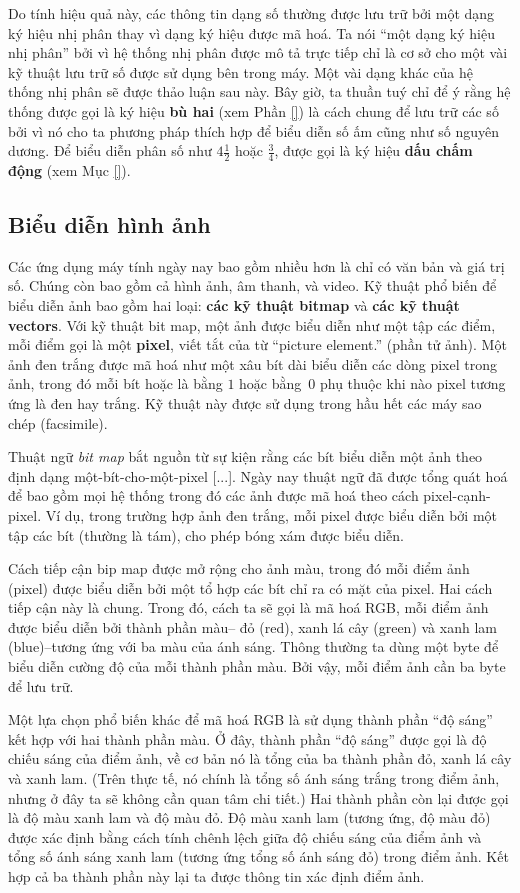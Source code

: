 Do tính hiệu quả này, các thông tin dạng số thường được lưu trữ bởi một dạng ký hiệu nhị
phân thay vì dạng ký hiệu được mã hoá. Ta nói ``một dạng ký hiệu nhị phân'' bởi vì hệ
thống nhị phân được mô tả trực tiếp chỉ là cơ sở cho một vài kỹ thuật lưu trữ số được sử
dụng bên trong máy. Một vài dạng khác của hệ thống nhị phân sẽ được thảo luận sau này. Bây
giờ, ta thuần tuý chỉ để ý rằng hệ thống được gọi là ký hiệu \textbf{bù hai} (xem Phần
\ref{}) là cách chung để lưu trữ các số bởi vì nó cho ta phương pháp thích hợp để biểu
diễn số ấm cũng như số nguyên dương. Để biểu diễn phân số như $4\frac{1}{2}$ hoặc
$\frac{3}{4}$, được gọi là ký hiệu \textbf{dấu chấm động} (xem Mục \ref{}).

\subsection*{Biểu diễn hình ảnh}

Các ứng dụng máy tính ngày nay bao gồm nhiều hơn là chỉ có văn bản và giá trị số. Chúng
còn bao gồm cả hình ảnh, âm thanh, và video. Kỹ thuật phổ biến để biểu diễn ảnh bao gồm
hai loại: \textbf{các kỹ thuật bitmap} và \textbf{các kỹ thuật vectors}. Với kỹ thuật bit
map, một ảnh được biểu diễn như một tập các điểm, mỗi điểm gọi là một \textbf{pixel}, viết
tắt của từ ``picture element.'' (phần tử ảnh). Một ảnh đen trắng được mã hoá như một xâu
bít dài biểu diễn các dòng pixel trong ảnh, trong đó mỗi bít hoặc là bằng $1$ hoặc
bằng~$0$ phụ thuộc khi nào pixel tương ứng là đen hay trắng. Kỹ thuật này được sử dụng
trong hầu hết các máy sao chép (facsimile).

Thuật ngữ \textit{bit map} bắt nguồn từ sự kiện rằng các bít biểu diễn một ảnh theo định
dạng một-bít-cho-một-pixel [...]. Ngày nay thuật ngữ đã được tổng quát hoá để bao gồm mọi
hệ thống trong đó các ảnh được mã hoá theo cách pixel-cạnh-pixel. Ví dụ, trong trường hợp
ảnh đen trắng, mỗi pixel được biểu diễn bởi một tập các bít (thường là tám), cho phép bóng
xám được biểu diễn.

Cách tiếp cận bip map được mở rộng cho ảnh màu, trong đó mỗi điểm ảnh (pixel) được biểu
diễn bởi một tổ hợp các bít chỉ ra có mặt của pixel. Hai cách tiếp cận này là chung. Trong
đó, cách ta sẽ gọi là mã hoá RGB, mỗi điểm ảnh được biểu diễn bởi thành phần màu-- đỏ
(red), xanh lá cây (green) và xanh lam (blue)--tương ứng với ba màu của ánh sáng. Thông
thường ta dùng một byte để biểu diễn cường độ của mỗi thành phần màu. Bởi vậy, mỗi điểm
ảnh cần ba byte để lưu trữ.

Một lựa chọn phổ biến khác để mã hoá RGB là sử dụng thành phần ``độ sáng'' kết hợp với hai
thành phần màu. Ở đây, thành phần ``độ sáng'' được gọi là độ chiếu sáng của điểm ảnh, về
cơ bản nó là tổng của ba thành phần đỏ, xanh lá cây và xanh lam. (Trên thực tế, nó chính
là tổng số ánh sáng trắng trong điểm ảnh, nhưng ở đây ta sẽ không cần quan tâm chi tiết.)
Hai thành phần còn lại được gọi là độ màu xanh lam và độ màu đỏ. Độ màu xanh lam (tương
ứng, độ màu đỏ) được xác định bằng cách tính chênh lệch giữa độ chiếu sáng của điểm ảnh và
tổng số ánh sáng xanh lam (tương ứng tổng số ánh sáng đỏ) trong điểm ảnh. Kết hợp cả ba
thành phần này lại ta được thông tin xác định điểm ảnh.

